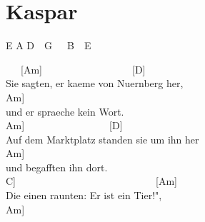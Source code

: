 \documentclass[
  letterpaper,
]{scrbook}
\begin{document}
\hypertarget{kaspar}{%
\chapter{Kaspar}\label{kaspar}}

E A D~~G~~~B~~E

~~~{[}Am{]}~~~~~~~~~~~~~~~~~~{[}D{]}\\
Sie sagten, er kaeme von Nuernberg her,\\
\hspace*{0.333em}\hspace*{0.333em}\hspace*{0.333em}\hspace*{0.333em}\hspace*{0.333em}\hspace*{0.333em}\hspace*{0.333em}{[}Am{]}\\
und er spraeche kein Wort.\\
\hspace*{0.333em}\hspace*{0.333em}\hspace*{0.333em}\hspace*{0.333em}\hspace*{0.333em}\hspace*{0.333em}\hspace*{0.333em}\hspace*{0.333em}{[}Am{]}~~~~~~~~~~~~~~~~~{[}D{]}~~~\\
Auf dem Marktplatz standen sie um ihn her\\
\hspace*{0.333em}\hspace*{0.333em}\hspace*{0.333em}\hspace*{0.333em}\hspace*{0.333em}\hspace*{0.333em}{[}Am{]}\\
und begafften ihn dort.\\
\hspace*{0.333em}\hspace*{0.333em}\hspace*{0.333em}{[}C{]}~~~~~~~~~~~~~~~~~~~~~~~~~~~~{[}Am{]}\\
Die einen raunten: Er ist ein Tier!",~~\\
\hspace*{0.333em}\hspace*{0.333em}\hspace*{0.333em}\hspace*{0.333em}\hspace*{0.333em}\hspace*{0.333em}\hspace*{0.333em}\hspace*{0.333em}\hspace*{0.333em}\hspace*{0.333em}{[}Am{]}\\
\end{document}
